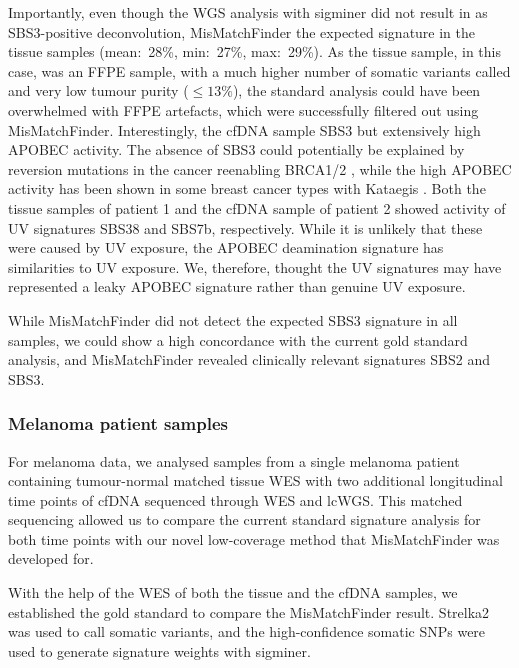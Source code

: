 Importantly, even though the WGS analysis with sigminer did not result in as SBS3-positive deconvolution, MisMatchFinder  the expected signature in the tissue samples (mean:~28\%, min:~27\%, max:~29\%). As the tissue sample, in this case, was an FFPE sample, with a much higher number of somatic variants called and very low tumour purity ($\leq 13\%$), the standard analysis could have been overwhelmed with FFPE artefacts, which were successfully filtered out using MisMatchFinder. Interestingly, the cfDNA sample  SBS3 but extensively high APOBEC activity. The absence of SBS3 could potentially be explained by reversion mutations in the cancer reenabling BRCA1/2 \cite{Lin2018a}, while the high APOBEC activity has been shown in some breast cancer types with Kataegis \cite{Alexandrov2020,Rebhandl2015}. Both the tissue samples of patient 1 and the cfDNA sample of patient 2 showed activity of UV signatures SBS38 and SBS7b, respectively. While it is unlikely that these were caused by UV exposure, the APOBEC deamination signature has similarities to UV exposure. We, therefore, thought the UV signatures may have represented a leaky APOBEC signature rather than genuine UV exposure.

While MisMatchFinder did not detect the expected SBS3 signature in all samples, we could show a high concordance with the current gold standard analysis, and MisMatchFinder revealed clinically relevant signatures SBS2 and SBS3. 

\subsubsection{Melanoma patient samples}
\label{mmf-sec:melpatients}

For  melanoma  data, we analysed samples from a single melanoma patient containing tumour-normal matched tissue WES with two additional longitudinal time points of cfDNA sequenced  through WES and lcWGS. This matched sequencing allowed us to compare the current standard signature analysis for both time points with our novel low-coverage method that MisMatchFinder was developed for.

With the help of the WES of both the tissue and the cfDNA samples, we established the gold standard to compare the MisMatchFinder result.  Strelka2 was used to call somatic variants, and the high-confidence somatic SNPs were used to generate signature weights with sigminer.

